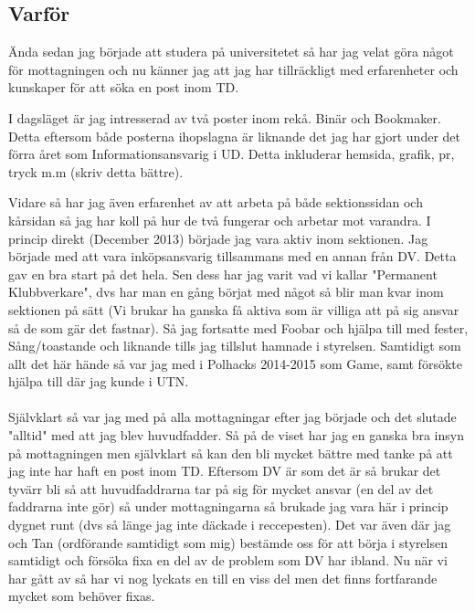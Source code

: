\documentclass[a4paper]{article}
\begin{document}
\subsection{Varför}

Ända sedan jag började att studera på universitetet så har jag velat göra något för mottagningen och nu känner jag att 
jag har tillräckligt med erfarenheter och kunskaper för att söka en post inom TD. 

I dagsläget är jag intresserad av två poster inom rekå. Binär och Bookmaker. Detta eftersom både posterna ihopslagna 
är liknande det jag har gjort under det förra året som Informationsansvarig i UD. Detta inkluderar hemsida, grafik, 
pr, tryck m.m (skriv detta bättre). 

Vidare så har jag även erfarenhet av att arbeta på både sektionssidan och kårsidan så jag har koll på hur de två 
fungerar och arbetar mot varandra. I princip direkt (December 2013) började jag vara aktiv inom sektionen. Jag började 
med att vara inköpsansvarig tillsammans med en annan från DV. Detta gav en bra start på det hela. Sen dess har jag 
varit vad vi kallar "Permanent Klubbverkare", dvs har man en gång börjat med något så blir man kvar inom sektionen på 
sätt (Vi brukar ha ganska få aktiva som är villiga att på sig ansvar så de som gär det fastnar). Så jag fortsatte med 
Foobar och hjälpa till med fester, Sång/toastande och liknande tills jag tillslut hamnade i styrelsen. Samtidigt som 
allt det här hände så var jag med i Polhacks 2014-2015 som Game, samt försökte hjälpa till där jag kunde i UTN. \\ \\ 
Självklart så var jag med på alla mottagningar efter jag började och det slutade "alltid" med att jag blev 
huvudfadder. Så på de viset har jag en ganska bra insyn på mottagningen men självklart så kan den bli mycket bättre 
med tanke på att jag inte har haft en post inom TD. Eftersom DV är som det är så brukar det tyvärr bli så att 
huvudfaddrarna tar på sig för mycket ansvar (en del av det faddrarna inte gör) så under mottagningarna så brukade jag 
vara här i princip dygnet runt (dvs så länge jag inte däckade i reccepesten). Det var även där jag och Tan (ordförande 
samtidigt som mig) bestämde oss för att börja i styrelsen samtidigt och försöka fixa en del av de problem som DV har 
ibland. Nu när vi har gått av så har vi nog lyckats en till en viss del men det finns fortfarande mycket som behöver 
fixas. \\ \\
\end{document}
